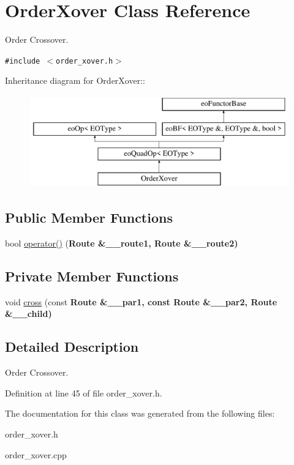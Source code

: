 \hypertarget{classOrderXover}{
\section{Order\-Xover Class Reference}
\label{classOrderXover}
}
Order Crossover.  


{\tt \#include $<$order\_\-xover.h$>$}

Inheritance diagram for Order\-Xover::\begin{figure}[H]
\begin{center}
\leavevmode
\includegraphics[height=4cm]{classOrderXover}
\end{center}
\end{figure}
\subsection*{Public Member Functions}
\begin{CompactItemize}
\item 
\hypertarget{classOrderXover_0ff6aada669eb8173322ed68cda1ac61}{
bool \hyperlink{classOrderXover_0ff6aada669eb8173322ed68cda1ac61}{operator()} (\bf{Route} \&\_\-\_\-route1, \bf{Route} \&\_\-\_\-route2)}
\label{classOrderXover_0ff6aada669eb8173322ed68cda1ac61}

\end{CompactItemize}
\subsection*{Private Member Functions}
\begin{CompactItemize}
\item 
\hypertarget{classOrderXover_d2bf90b5f46ac4a344777e17bc5f364d}{
void \hyperlink{classOrderXover_d2bf90b5f46ac4a344777e17bc5f364d}{cross} (const \bf{Route} \&\_\-\_\-par1, const \bf{Route} \&\_\-\_\-par2, \bf{Route} \&\_\-\_\-child)}
\label{classOrderXover_d2bf90b5f46ac4a344777e17bc5f364d}

\end{CompactItemize}


\subsection{Detailed Description}
Order Crossover. 



Definition at line 45 of file order\_\-xover.h.

The documentation for this class was generated from the following files:\begin{CompactItemize}
\item 
order\_\-xover.h\item 
order\_\-xover.cpp\end{CompactItemize}
